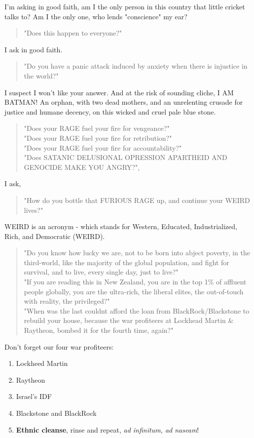 \documentclass[16pt,openany,oneside]{book}
\begin{document}
I'm asking in good faith, am I the only person in this country that little cricket talks to? Am I the only one, who lends "conscience" my ear?
\begin{quote}
    "Does this happen to everyone?"
\end{quote}
I ask in good faith.
\begin{quote}
    "Do you have a panic attack induced by anxiety when there is injustice in the world?"
\end{quote}
I suspect I won't like your answer.
And at the risk of sounding cliche, I AM BATMAN!
An orphan, with two dead mothers, and an unrelenting crusade for justice and humane decency, on this wicked and cruel pale blue stone.
\begin{quote}
    "Does your RAGE fuel your fire for vengeance?" \\ 
    "Does your RAGE fuel your fire for retribution?" \\ 
    "Does your RAGE fuel your fire for accountability?" \\ 
    "Does SATANIC DELUSIONAL OPRESSION APARTHEID AND GENOCIDE MAKE YOU ANGRY?", 
\end{quote}
I ask,
\begin{quote}
    "How do you bottle that FURIOUS RAGE up, and continue your WEIRD lives?"
\end{quote}
WEIRD is an acronym \cite{muthukrishna2020beyondweird} - which stands for Western, Educated, Industrialized, Rich, and Democratic (WEIRD).
\begin{quote}
    "Do you know how lucky we are, not to be born into abject poverty, in the third-world, like the majority of the global population, and fight for survival, and to live, every single day, just to live?"
    \\
    "If you are reading this in New Zealand, you are in the top 1\% of affluent people globally, you are the ultra-rich, the liberal elites, the out-of-touch with reality, the privileged?"
    \\
    "When was the last couldnt afford the loan from BlackRock/Blackstone to rebuild your house, because the war profiteers at Lockhead Martin \& Raytheon, bombed it for the fourth time, again?"
\end{quote}

Don't forget our four war profiteers:

\begin{enumerate}
    \item Lockheed Martin 
    \item Raytheon
    \item Israel's IDF
    \item Blackstone and BlackRock
    \item[] \textbf{Ethnic cleanse}, rinse and repeat, \textit{ad infinitum, ad naseam}!
\end{enumerate}
\end{document}
